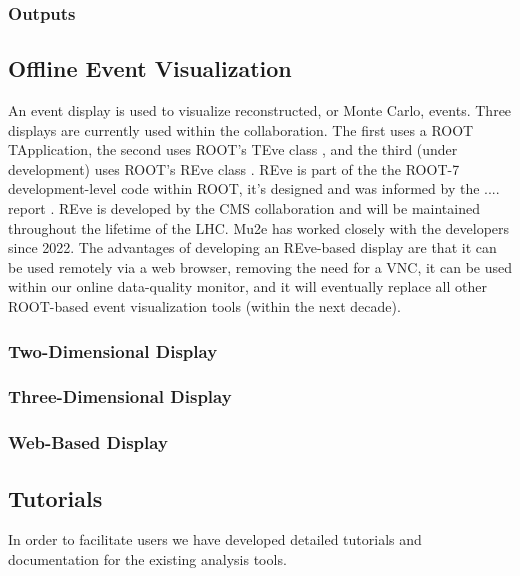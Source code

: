 \subsubsection{Outputs}

\subsection{Offline Event Visualization}

An event display is used to visualize reconstructed, or Monte Carlo, events. Three displays are currently used within the collaboration. The first uses a ROOT TApplication, the second uses ROOT's TEve class \cite{}, and the third (under development) uses ROOT's REve class \cite{}. REve is part of the the ROOT-7 development-level code within ROOT, it's designed and was informed by the .... report \cite{}. REve is developed by the CMS collaboration and will be maintained throughout the lifetime of the LHC. Mu2e has worked closely with the developers since 2022. The advantages of developing an REve-based display are that it can be used remotely via a web browser, removing the need for a VNC, it can be used within our online data-quality monitor, and it will eventually replace all other ROOT-based event visualization tools (within the next decade).


\subsubsection{Two-Dimensional Display}
\subsubsection{Three-Dimensional Display}
\subsubsection{Web-Based Display}

\subsection{Tutorials}


In order to facilitate users we have developed detailed tutorials and documentation for the existing analysis tools.